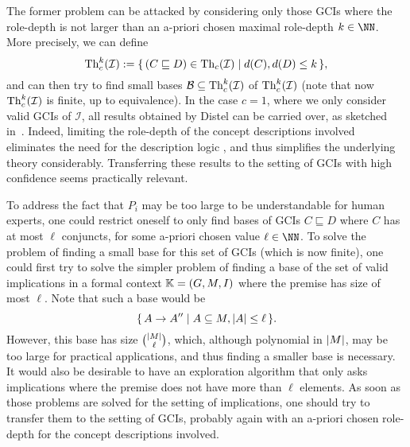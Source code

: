 The former problem can be attacked by considering only those GCIs where the role-depth is
not larger than an a-priori chosen maximal role-depth $k \in \NN$.  More precisely, we can
define
\begin{equation*}
  \operatorname{Th}_{c}^{k}(\mathcal{I}) := {\{\, (C \sqsubseteq D) \in \operatorname{Th}_{c}(\mathcal{I}) \mid d(C), d(D)
    \leq k \,\}},
\end{equation*}
and can then try to find small bases $\mathcal{B} \subseteq \operatorname{Th}_{c}^{k}(\mathcal{I})$ of
$\operatorname{Th}_{c}^{k}(\mathcal{I})$ (note that now $\operatorname{Th}_{c}^{k}(\mathcal{I})$ is finite, up to
equivalence).  In the case $c = 1$, where we only consider valid GCIs of $\mathcal{I}$,
all results obtained by Distel can be carried over, as sketched in~\cite{FCA-and-Logics}.
Indeed, limiting the role-depth of the concept descriptions involved eliminates the need
for the description logic \ELgfpbot, and thus simplifies the underlying theory
considerably.  Transferring these results to the setting of GCIs with high confidence
seems practically relevant.

To address the fact that $P_{i}$ may be too large to be understandable for human experts,
one could restrict oneself to only find bases of GCIs $C \sqsubseteq D$ where $C$ has at
most $\ell$ conjuncts, for some a-priori chosen value $\ell \in \NN$.  To solve the
problem of finding a small base for this set of GCIs (which is now finite), one could
first try to solve the simpler problem of finding a base of the set of valid implications
in a formal context ${\mathbb{K}} = (G, M, I)$ where the premise has size of most $\ell$.  Note
that such a base would be
\begin{equation*}
  {\ensuremath{\{\, A \to A'' \mid A \subseteq M, \lvert A\rvert \leq \ell \,\}}}.
\end{equation*}
However, this base has size $\binom{\lvert M\rvert}{\ell}$, which, although polynomial in $\lvert M\rvert$, may be too large for practical applications, and thus finding a smaller base is
necessary.  It would also be desirable to have an exploration algorithm that only asks
implications where the premise does not have more than $\ell$ elements.  As soon as those
problems are solved for the setting of implications, one should try to transfer them to
the setting of GCIs, probably again with an a-priori chosen role-depth for the concept
descriptions involved.


